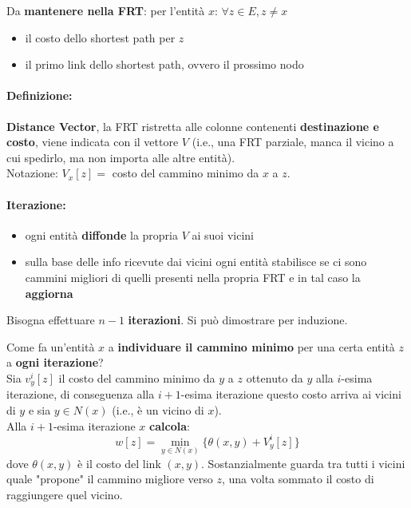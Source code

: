 Da \textbf{mantenere nella FRT}: per l'entità $x$: $\forall z \in E, z \neq x$
\begin{itemize}
	\item il costo dello shortest path per $z$ 
	\item il primo link dello shortest path, ovvero il prossimo nodo
\end{itemize}

\paragraph{Definizione:} \textbf{Distance Vector}, la FRT ristretta alle colonne contenenti \textbf{destinazione e costo}, viene indicata con il vettore $V$ (i.e., una FRT parziale, manca il vicino a cui spedirlo, ma non importa alle altre entità).\\
Notazione: $V_x [z] =$ costo del cammino minimo da $x$ a $z$.\\

\paragraph{Iterazione:}
\begin{itemize}
	\item ogni entità \textbf{diffonde} la propria $V$ ai suoi vicini 
	\item sulla base delle info ricevute dai vicini ogni entità stabilisce se ci sono cammini migliori di quelli presenti nella propria FRT e in tal caso la \textbf{aggiorna}
\end{itemize}

Bisogna effettuare $n-1$ \textbf{iterazioni}. Si può dimostrare per induzione.\\

\newpage

Come fa un'entità $x$ a \textbf{individuare il cammino minimo} per una certa entità $z$ a \textbf{ogni iterazione}?\\

Sia $v_y^i[z]$ il costo del cammino minimo da $y$ a $z$ ottenuto da $y$ alla $i$-esima iterazione, di conseguenza alla $i+1$-esima iterazione questo costo arriva ai vicini di $y$ e sia $y \in N(x)$ (i.e., è un vicino di $x$).\\

Alla $i+1$-esima iterazione $x$ \textbf{calcola}:
$$ w[z] = \min_{y \in N(x)} \{\theta(x,y) + V_y^i [z] \}$$
dove $\theta(x,y)$ è il costo del link $(x,y)$. Sostanzialmente guarda tra tutti i vicini quale "propone" il cammino migliore verso $z$, una volta sommato il costo di raggiungere quel vicino.\\


